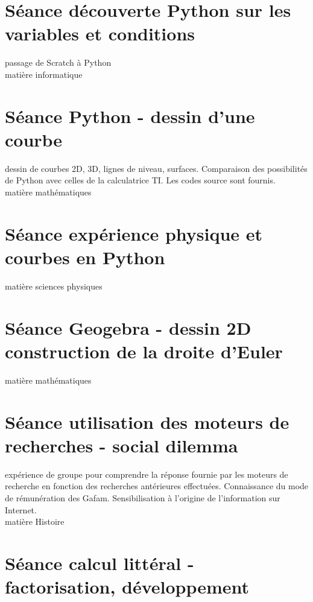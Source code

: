 \documentclass{moncours}
\begin{document}
\section{Séance découverte Python sur les variables et conditions}

passage de Scratch à Python\\

matière informatique

\section{Séance Python - dessin d'une courbe}

dessin de courbes 2D, 3D, lignes de niveau, surfaces. Comparaison des possibilités de Python avec celles de la calculatrice TI. Les codes source sont fournis.\\

matière mathématiques

\section{Séance expérience physique et courbes en Python}

matière sciences physiques


\section{Séance Geogebra - dessin 2D construction de la droite d'Euler}

matière mathématiques




\section{Séance utilisation des moteurs de recherches - social dilemma}

expérience de groupe pour comprendre la réponse fournie par les moteurs de recherche en fonction des recherches antérieures effectuées. Connaissance du mode de rémunération des Gafam. Sensibilisation à l'origine de l'information sur Internet.\\

matière Histoire



\section{Séance calcul littéral - factorisation, développement}
\end{document}
